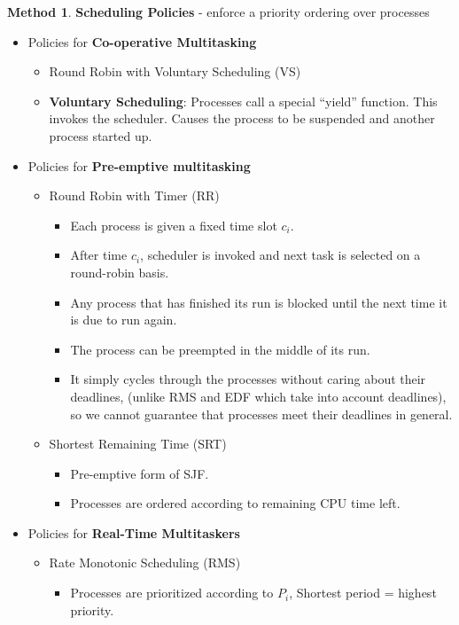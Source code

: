 \documentclass[11pt,a4paper]{article}
\theoremstyle{definition}
\newtheorem{method}{Method}[section]
\newenvironment{myitemize}
{ \begin{itemize}
    \setlength{\itemsep}{5pt}
    \setlength{\parskip}{0pt}
    \setlength{\parsep}{0pt}     }
{ \end{itemize}                  }
\begin{document}
\begin{method}{\textbf{Scheduling Policies} - enforce a priority ordering over processes}
\begin{myitemize}
\begin{myitemize}
\begin{myitemize}
				\item Potential for starvation.
			\end{myitemize}
		\end{myitemize}
		\item Policies for \textbf{Co-operative Multitasking}
		\begin{myitemize}
			\item Round Robin with Voluntary Scheduling (\textsf{VS})
			\item \textbf{Voluntary Scheduling}: Processes call a special “yield” function. This invokes the scheduler. Causes the process to be suspended and another process started up.
		\end{myitemize}
		\item Policies for \textbf{Pre-emptive multitasking}
		\begin{myitemize}
			\item Round Robin with Timer (\textsf{RR})
			\begin{myitemize}
				\item Each process is given a fixed time slot $c_i$.
				\item After time $c_i$, scheduler is invoked and next task is selected on a round-robin basis.
				\item Any process that has finished its run is blocked until the next time it is due to run again.
				\item The process can be preempted in the middle of its run.
				\item It simply cycles through the processes without caring about their deadlines, (unlike RMS and EDF which take into account deadlines), so we cannot guarantee that processes meet their deadlines in general.
			\end{myitemize}
			\item Shortest Remaining Time (\textsf{SRT})
			\begin{myitemize}
				\item Pre-emptive form of SJF.
				\item Processes are ordered according to remaining CPU time left.
			\end{myitemize}
		\end{myitemize}
		\item Policies for \textbf{Real-Time Multitaskers}
		\begin{myitemize}
			\item Rate Monotonic Scheduling (\textsf{RMS})
			\begin{myitemize}
				\item Processes are prioritized according to $P_i$, Shortest period = highest priority.

\end{myitemize}
\end{myitemize}
\end{myitemize}
\end{method}
\end{document}

